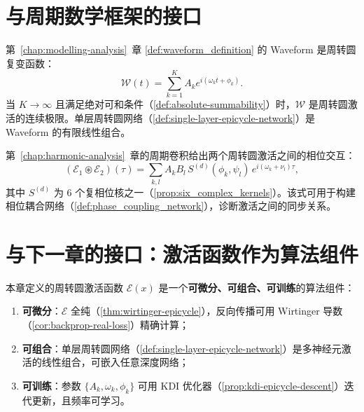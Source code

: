 \section{与周期数学框架的接口}

\begin{remark}\label{rem:waveform-as-activation}
第~\ref{chap:modelling-analysis}~章 \cref{def:waveform_definition} 的 Waveform 是周转圆复变函数：
\[
\mathcal W(t)=\sum_{k=1}^{K}A_k e^{i(\omega_k t+\phi_k)}.
\]
当 $K\to\infty$ 且满足绝对可和条件（\cref{def:absolute-summability}）时，$\mathcal W$ 是周转圆激活的连续极限。单层周转圆网络（\cref{def:single-layer-epicycle-network}）是 Waveform 的有限线性组合。
\end{remark}

\begin{remark}[周期卷积与激活交互]\label{rem:periodic-convolution-activation}
第~\ref{chap:harmonic-analysis}~章的周期卷积给出两个周转圆激活之间的相位交互：
\[
(\mathcal E_1\circledast\mathcal E_2)(\tau)=\sum_{k,l}A_kB_l\,S^{(d)}(\phi_k,\psi_l)\,e^{i(\omega_k+\nu_l)\tau},
\]
其中 $S^{(d)}$ 为 6 个复相位核之一（\cref{prop:six_complex_kernels}）。该式可用于构建相位耦合网络（\cref{def:phase_coupling_network}），诊断激活之间的同步关系。
\end{remark}

\section{与下一章的接口：激活函数作为算法组件}
\label{sec:activation_to_algorithm_interface}

\begin{remark}[激活函数的算法属性]\label{rem:activation_as_algorithm_component}
本章定义的周转圆激活函数 $\mathcal E(x)$ 是一个\textbf{可微分、可组合、可训练}的算法组件：
\begin{enumerate}[label=(\roman*)]
    \item \textbf{可微分}：$\mathcal E$ 全纯（\cref{thm:wirtinger-epicycle}），反向传播可用 Wirtinger 导数（\cref{cor:backprop-real-loss}）精确计算；
    \item \textbf{可组合}：单层周转圆网络（\cref{def:single-layer-epicycle-network}）是多神经元激活的线性组合，可嵌入任意深度网络；
    \item \textbf{可训练}：参数 $\{A_k,\omega_k,\phi_k\}$ 可用 KDI 优化器（\cref{prop:kdi-epicycle-descent}）迭代更新，且频率可学习。
\end{enumerate}
\end{remark}

